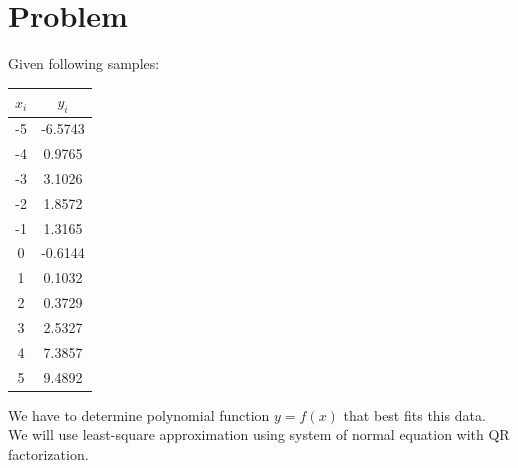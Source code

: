 \section{Problem}
Given following samples:
\begin{center}
  \begin{tabular}{| c | c |}
\hline
$x_i$ & $y_i$ \\
\hline
-5 & -6.5743\\
\hline
-4 & 0.9765\\
\hline
-3 & 3.1026\\
\hline
-2 & 1.8572 \\
\hline
-1 & 1.3165 \\
\hline
0 & -0.6144 \\
\hline
1 & 0.1032 \\
\hline
2 & 0.3729 \\
\hline
3 & 2.5327 \\
\hline
4 & 7.3857 \\
\hline
5 & 9.4892 \\
\hline

\end{tabular}
\end{center}

We have to determine polynomial function $ y  = f(x) $ that best fits this data. \\
We will use least-square approximation using system of normal equation with QR factorization.

